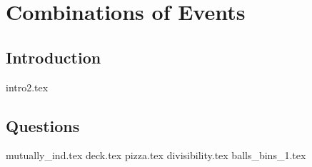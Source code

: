 \documentclass{exam}
\begin{document}
\section{Combinations of Events}
\subsection{Introduction}
{intro2.tex}
\subsection{Questions}
\begin{questions}
{mutually_ind.tex}
{deck.tex}
{pizza.tex}
{divisibility.tex}
{balls_bins_1.tex}
\end{questions}
\end{document}
